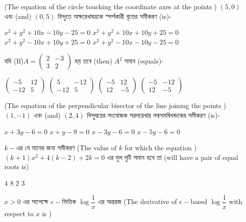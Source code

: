 \documentclass[addpoints]{exam}
\begin{document}
\begin{questions}
\question (The equation of the circle touching the coordinate axes at the points ) $ (5,0) $ এবং (and) $ (0,5) $ বিন্দুতে অক্ষরেখাদ্বয়কে স্পর্শকারী বৃত্তের সমীকরণ (is)- 

\begin{oneparchoices}
\choice $ x^{2}+y^{2}+10x-10y-25=0 $
\choice $ x^{2}+y^{2}+10x+10y+25=0 $
\choice $ x^{2}+y^{2}-10x+10y+25=0 $
\choice $ x^{2}+y^{2}-10x-10y-25=0 $
\end{oneparchoices}

\question  যদি (If)$ A = \begin{pmatrix}
2 & -3\\
3 & 2
\end{pmatrix} $ হয় তবে (then) $ A^{2} $ সমান (equals)-

\begin{oneparchoices}
\choice $ \begin{pmatrix}
-5 & 12\\
-12 & 5
\end{pmatrix} $
\choice $ \begin{pmatrix}
5 & -12\\
-12 & 5
\end{pmatrix} $
\choice $ \begin{pmatrix}
-5 & 12\\
12 & -5
\end{pmatrix} $
\choice $ \begin{pmatrix}
-5 & -12\\
12 & -5
\end{pmatrix} $
\end{oneparchoices}

\question (The equation of the perpendicular bisector of the line joining the points ) $ (1,-1) $ এবং (and) $ (2,4) $ বিন্দুদ্বয়ের সংযোজক সরলরেখার লম্বসমদ্বিখন্ডকের সমীকরণ (is)-

\begin{oneparchoices}
\choice $ x+3y-6=0 $
\choice $ x+y-9=0 $
\choice $ x-3y-6=0 $
\choice $ x-5y-6 = 0 $
\end{oneparchoices}

\question $ k- $এর যে মানের জন্য সমীকরণ (The value of $ k $ for which the equation ) $ (k+1)x^{2}+4(k-2)+2k=0 $ এর মুল দুটি সমান হবে তা (will have a pair of equal roots is)

\begin{oneparchoices}
\choice $ 4 $
\choice $ 8 $
\choice $ 2 $
\choice $ 3 $
\end{oneparchoices}

\question $ x>0 $ এর সাপেক্ষে $ e- $ভিত্তিক $ \log \dfrac{1}{x} $ এর অন্তরজ (The derivative of $ e- $based $ \log \dfrac{1}{x} $ with respect to $ x $ is )


\end{questions}
\end{document}

